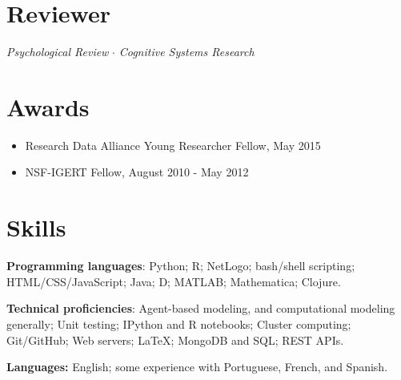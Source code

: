 \documentclass[letterpaper,11pt,oneside]{article}
\begin{document}
\noindent
\section*{\textcolor{gunmetal}{Reviewer}}

  \begin{hangparas}{0.25in}{1}
    \emph{Psychological Review} $\cdot$ \emph{Cognitive Systems Research}
  \end{hangparas}

\noindent
\section*{\textcolor{gunmetal}{Awards}}
\begin{itemize}
  \item Research Data Alliance Young Researcher Fellow, May 2015
  \item NSF-IGERT Fellow, August 2010 - May 2012
\end{itemize}

\section*{\textcolor{gunmetal}{Skills}}

\begin{hangparas}{0.25in}{1}
  \textbf{Programming languages}: Python; R; NetLogo; bash/shell scripting; 
  HTML/CSS/JavaScript; Java; D; MATLAB; Mathematica; Clojure.

  \textbf{Technical proficiencies}: Agent-based modeling, and computational 
  modeling generally; Unit testing; IPython and R notebooks; Cluster computing;
  Git/GitHub; Web servers; \LaTeX; MongoDB and SQL; REST APIs.

  \textbf{Languages:} English; some experience with Portuguese, French,
  and Spanish. 
\end{hangparas}


\end{document}
